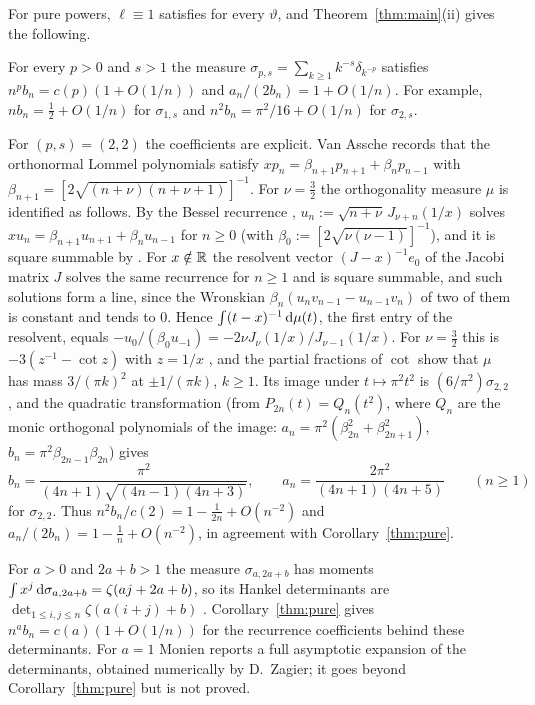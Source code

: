 For pure powers, $\ell\equiv1$ satisfies \Ath{\vartheta} for every $\vartheta$, and Theorem~\ref{thm:main}(ii) gives
the following.

\begin{corollary}\label{thm:pure}
For every $p>0$ and $s>1$ the measure $\sigma_{p,s}=\sum_{k\ge1}k^{-s}\delta_{k^{-p}}$ satisfies
$n^pb_n=c(p)(1+O(1/n))$ and $a_n/(2b_n)=1+O(1/n)$. For example, $nb_n=\frac12+O(1/n)$ for $\sigma_{1,s}$ and
$n^2b_n=\pi^2/16+O(1/n)$ for $\sigma_{2,s}$.
\end{corollary}

\begin{remark}\label{rem:pure-lommel}
For $(p,s)=(2,2)$ the coefficients are explicit. Van Assche \cite[\S3]{VA} records that the orthonormal Lommel
polynomials satisfy $xp_n=\beta_{n+1}p_{n+1}+\beta_np_{n-1}$ with $\beta_{n+1}=[2\sqrt{(n+\nu)(n+\nu+1)}]^{-1}$. For
$\nu=\frac32$ the orthogonality measure $\mu$ is identified as follows. By the Bessel recurrence
\cite[(10.6.1)]{DLMF}, $u_n:=\sqrt{n+\nu}\,J_{\nu+n}(1/x)$ solves $xu_n=\beta_{n+1}u_{n+1}+\beta_nu_{n-1}$ for $n\ge0$
(with $\beta_0:=[2\sqrt{\nu(\nu-1)}]^{-1}$), and it is square summable by \cite[(10.2.2)]{DLMF}. For $x\notin\mathbb{R}$ the
resolvent vector $(J-x)^{-1}e_0$ of the Jacobi matrix $J$ solves the same recurrence for $n\ge1$ and is square
summable, and such solutions form a line, since the Wronskian $\beta_n(u_nv_{n-1}-u_{n-1}v_n)$ of two of them is
constant and tends to $0$. Hence $\int(t-x)^{-1}\,\mathrm{d}\mu(t)$, the first entry of the resolvent, equals $-u_0/(\beta_0u_{-1})
=-2\nu J_\nu(1/x)/J_{\nu-1}(1/x)$. For $\nu=\frac32$ this is $-3(z^{-1}-\cot z)$ with $z=1/x$
\cite[(10.16.1), (10.6.1)]{DLMF}, and the partial fractions of $\cot$ \cite[(4.22.3)]{DLMF} show that $\mu$ has mass
$3/(\pi k)^2$ at $\pm1/(\pi k)$, $k\ge1$. Its image under $t\mapsto\pi^2t^2$ is $(6/\pi^2)\sigma_{2,2}$, and the
quadratic transformation (from $P_{2n}(t)=Q_n(t^2)$, where $Q_n$ are the monic orthogonal polynomials of the image: $a_n=\pi^2(\beta_{2n}^2+\beta_{2n+1}^2)$, $b_n=\pi^2\beta_{2n-1}\beta_{2n}$) gives
\[
  b_n=\frac{\pi^2}{(4n+1)\sqrt{(4n-1)(4n+3)}},\qquad a_n=\frac{2\pi^2}{(4n+1)(4n+5)}\qquad(n\ge1)
\]
for $\sigma_{2,2}$. Thus $n^2b_n/c(2)=1-\frac1{2n}+O(n^{-2})$ and $a_n/(2b_n)=1-\frac1n+O(n^{-2})$, in agreement with
Corollary~\ref{thm:pure}.
\end{remark}

\begin{remark}\label{rem:pure-zeta}
For $a>0$ and $2a+b>1$ the measure $\sigma_{a,2a+b}$ has moments $\int x^j\,\mathrm{d}\sigma_{a,2a+b}=\zeta(aj+2a+b)$, so
its Hankel determinants are $\det_{1\le i,j\le n}\zeta(a(i+j)+b)$ \cite[Corollary~1.4]{Paper1}.
Corollary~\ref{thm:pure} gives $n^ab_n=c(a)(1+O(1/n))$ for the recurrence coefficients behind these determinants. For
$a=1$ Monien \cite{Monien} reports a full asymptotic expansion of the determinants, obtained numerically by
D.~Zagier; it goes beyond Corollary~\ref{thm:pure} but is not proved.
\end{remark}

